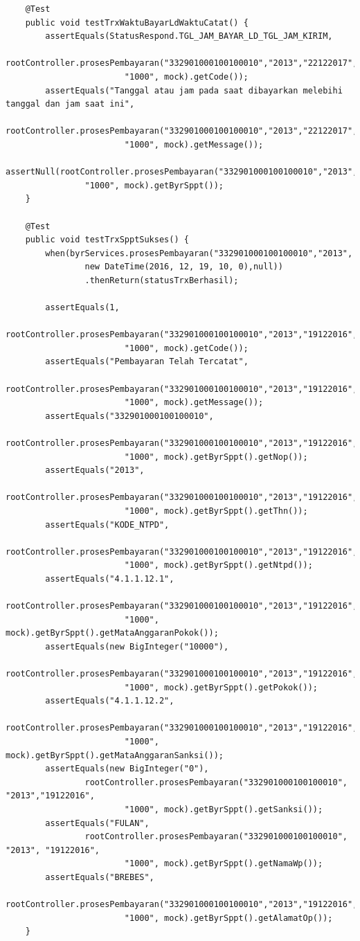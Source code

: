 \documentclass[pdftex,12pt, oneside]{article}
\begin{document}
\begin{enumerate}[A.]
\begin{enumerate}[1.]
\begin{lstlisting}
    @Test
    public void testTrxWaktuBayarLdWaktuCatat() {
        assertEquals(StatusRespond.TGL_JAM_BAYAR_LD_TGL_JAM_KIRIM,
                rootController.prosesPembayaran("332901000100100010","2013","22122017",
                        "1000", mock).getCode());
        assertEquals("Tanggal atau jam pada saat dibayarkan melebihi tanggal dan jam saat ini",
                rootController.prosesPembayaran("332901000100100010","2013","22122017",
                        "1000", mock).getMessage());
        assertNull(rootController.prosesPembayaran("332901000100100010","2013","22122017",
                "1000", mock).getByrSppt());
    }

    @Test
    public void testTrxSpptSukses() {
        when(byrServices.prosesPembayaran("332901000100100010","2013",
                new DateTime(2016, 12, 19, 10, 0),null))
                .thenReturn(statusTrxBerhasil);

        assertEquals(1,
                rootController.prosesPembayaran("332901000100100010","2013","19122016",
                        "1000", mock).getCode());
        assertEquals("Pembayaran Telah Tercatat",
                rootController.prosesPembayaran("332901000100100010","2013","19122016",
                        "1000", mock).getMessage());
        assertEquals("332901000100100010",
                rootController.prosesPembayaran("332901000100100010","2013","19122016",
                        "1000", mock).getByrSppt().getNop());
        assertEquals("2013",
                rootController.prosesPembayaran("332901000100100010","2013","19122016",
                        "1000", mock).getByrSppt().getThn());
        assertEquals("KODE_NTPD",
                rootController.prosesPembayaran("332901000100100010","2013","19122016",
                        "1000", mock).getByrSppt().getNtpd());
        assertEquals("4.1.1.12.1",
                rootController.prosesPembayaran("332901000100100010","2013","19122016",
                        "1000", mock).getByrSppt().getMataAnggaranPokok());
        assertEquals(new BigInteger("10000"),
                rootController.prosesPembayaran("332901000100100010","2013","19122016",
                        "1000", mock).getByrSppt().getPokok());
        assertEquals("4.1.1.12.2",
                rootController.prosesPembayaran("332901000100100010","2013","19122016",
                        "1000", mock).getByrSppt().getMataAnggaranSanksi());
        assertEquals(new BigInteger("0"),
                rootController.prosesPembayaran("332901000100100010", "2013","19122016",
                        "1000", mock).getByrSppt().getSanksi());
        assertEquals("FULAN",
                rootController.prosesPembayaran("332901000100100010", "2013", "19122016",
                        "1000", mock).getByrSppt().getNamaWp());
        assertEquals("BREBES",
                rootController.prosesPembayaran("332901000100100010","2013","19122016",
                        "1000", mock).getByrSppt().getAlamatOp());
    }




\end{lstlisting}
\end{enumerate}
\end{enumerate}
\end{document}
